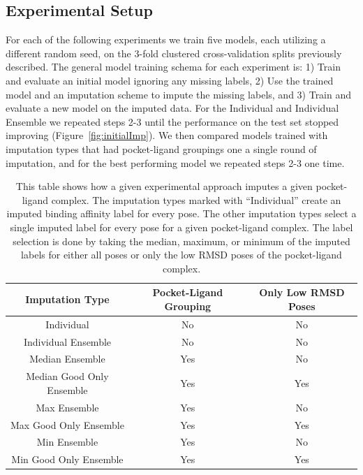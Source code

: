 \documentclass[journal=jcim,manuscript=article]{achemso}
\begin{document}
\subsection{Experimental Setup}
For each of the following experiments we train five models, each utilizing a different random seed, on the 3-fold clustered cross-validation splits previously described.
The general model training schema for each experiment is: 1) Train and evaluate an initial model ignoring any missing labels, 2) Use the trained model and an imputation scheme to impute the missing labels, and 3) Train and evaluate a new model on the imputed data. For the Individual and Individual Ensemble we repeated steps 2-3 until the performance on the test set stopped improving (Figure~\ref{fig:initialImp}).
We then compared models trained with imputation types that had pocket-ligand groupings one a single round of imputation, and for the best performing model we repeated steps 2-3 one time.

\begin{table}
    \centering
    \begin{tabular}{c|c|c}
         Imputation Type & Pocket-Ligand Grouping & Only Low RMSD Poses \\
         \hline
         Individual & No & No \\
        \hline
         Individual Ensemble & No & No \\
         \hline
         Median Ensemble & Yes & No \\
         Median Good Only Ensemble & Yes & Yes \\
         Max Ensemble & Yes & No \\
         Max Good Only Ensemble & Yes & Yes \\
         Min Ensemble & Yes & No \\
         Min Good Only Ensemble & Yes & Yes \\
    \end{tabular}
    \caption{This table shows how a given experimental approach imputes a given pocket-ligand complex. The imputation types marked with ``Individual'' create an imputed binding affinity label for every pose. The other imputation types select a single imputed label for every pose for a given pocket-ligand complex. The label selection is done by taking the median, maximum, or minimum of the imputed labels for either all poses or only the low RMSD poses of the pocket-ligand complex.}
    \label{tab:expApproach}
\end{table}
\end{document}
